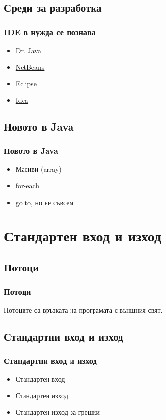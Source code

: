 \documentclass{beamer}
\begin{document}
  \subsection{Среди за разработка}

  \begin{frame}
    \frametitle{IDE в нужда се познава}
    \begin{itemize}
      \item{\href{http://drjava.org/}{Dr. Java}}
      \item{\href{https://netbeans.org}{NetBeans}}
      \item{\href{http://www.eclipse.org/home/index.php}{Eclipse}}
      \item{\href{http://www.jetbrains.com/idea/}{Idea}}
    \end{itemize}
  \end{frame}

  \subsection{Новото в Java}

  \begin{frame}
    \frametitle{Новото в Java}
    \begin{itemize}
      \item{Масиви (array)}
      \item{for-each}
      \item{go to, но не съвсем}
    \end{itemize}
  \end{frame}

  \section{Стандартен вход и изход}
  \subsection{Потоци}

  \begin{frame}
    \frametitle{Потоци}
    Потоците са връзката на програмата с външния свят.
  \end{frame}

  \subsection{Стандартни вход и изход}

  \begin{frame}
    \frametitle{Стандартни вход и изход}
    \begin{itemize}
      \item{Стандартен вход}
      \item{Стандартен изход}
      \item{Стандартен изход за грешки}
    \end{itemize}
  \end{frame}
\end{document}
